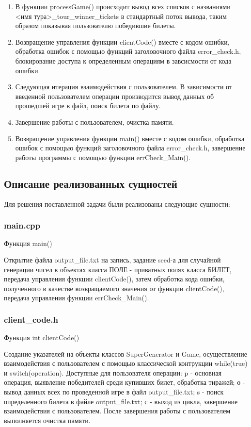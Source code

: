 \documentclass[a4paper,14pt]{article}
\begin{document}
\begin{enumerate}
  \item В функции processGame() происходит вывод всех списков с названиями  <имя тура>\_tour\_winner\_tickets в стандартный поток вывода, таким образом показывая пользователю победившие билеты.
  \item Возвращение управления функции clientCode() вместе с кодом ошибки, обработка ошибок с помощью функций заголовочного файла error\_check.h, блокирование доступа к определенным операциям в завсисмости от кода ошибки.
  \item Следующая итерация взаимодействия с пользователем. В зависимости от введенной пользователем операции производится вывод данных об прошедшей игре в файл, поиск билета по файлу.
  \item Завершение работы с пользователем, очистка памяти.
  \item Возвращение управления функции main() вместе с кодом ошибки, обработка ошибок с помощью функций заголовочного файла error\_check.h, завершение работы программы с помощью функции errCheck\_Main().
\end{enumerate}
\subsection{Описание реализованных сущностей}
Для решения поставленной задачи были реализованы следующие сущности:
\subsubsection{main.cpp}
\begin{center}
   Функция main()
\end{center}

Открытие файла output\_file.txt на запись, задание seed-а для случайной генерации чисел в объектах класса ПОЛЕ - приватных полях класса БИЛЕТ, передача управления функции clientCode(), затем обработка кода ошибки, полученного в качестве возвращаемого значения от функции clientCode(), передача управления функции errCheck\_Main().
\subsubsection{client\_code.h}
\begin{center}
   Функция int clientCode()
\end{center}

Создание указателей на объекты классов SuperGenerator и Game, осуществление взаимодействия с пользователем с помощью классической контрукции while(true) и switch(operation). Доступные для пользователя операции: p - основная операция, выявление победителей среди купивших билет, обработка тиражей; о - вывод данных всех по проведенной игре в файл output\_file.txt; s - поиск определенного билета в файле output\_file.txt; с - выход из цикла, завершение взаимодействия с пользователем. После завершения работы с пользователем выполняется очистка памяти.
\end{document}
